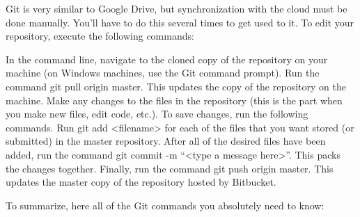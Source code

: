 Git is very similar to Google Drive, but synchronization with the cloud must be done manually. You'll have to do this several times to get used to it. To edit your repository, execute the following commands:

In the command line, navigate to the cloned copy of the repository on your machine (on Windows machines, use the Git command prompt).
Run the command git pull origin master. This updates the copy of the repository on the machine.
Make any changes to the files in the repository (this is the part when you make new files, edit code, etc.).
To save changes, run the following commands.
Run git add <filename> for each of the files that you want stored (or submitted) in the master repository.
After all of the desired files have been added, run the command git commit -m ``<type a message here>''. This packs the changes together.
Finally, run the command git push origin master. This updates the master copy of the repository hosted by Bitbucket.

To summarize, here all of the Git commands you absolutely need to know:


